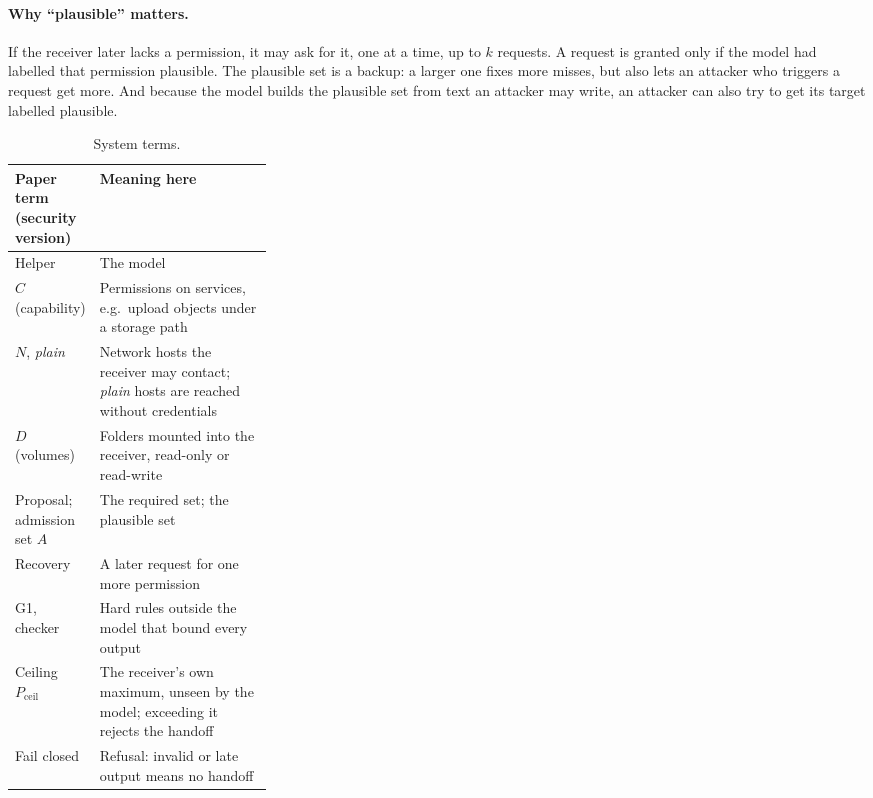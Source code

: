 \documentclass[10pt]{article}
\begin{document}
\paragraph{Why ``plausible'' matters.} If the receiver later lacks a permission, it may ask for it, one at a time, up to
$k$ requests. A request is granted only if the model had labelled that permission plausible. The plausible set is a
backup: a larger one fixes more misses, but also lets an attacker who triggers a request get more. And because the model
builds the plausible set from text an attacker may write, an attacker can also try to get its target labelled plausible.

\begin{table}[H]\centering\small
\begin{tabularx}{\linewidth}{L{0.3\linewidth}Y}
\toprule
Paper term (security version) & Meaning here \\
\midrule
Helper & The model \\
$C$ (capability) & Permissions on services, e.g.\ upload objects under a storage path \\
$N$, \emph{plain} & Network hosts the receiver may contact; \emph{plain} hosts are reached without credentials \\
$D$ (volumes) & Folders mounted into the receiver, read-only or read-write \\
Proposal; admission set $A$ & The required set; the plausible set \\
Recovery & A later request for one more permission \\
G1, checker & Hard rules outside the model that bound every output \\
Ceiling $P_{\mathrm{ceil}}$ & The receiver's own maximum, unseen by the model; exceeding it rejects the handoff \\
Fail closed & Refusal: invalid or late output means no handoff \\
\bottomrule
\end{tabularx}
\caption{System terms.}\label{tab:terms}
\end{table}
\end{document}
